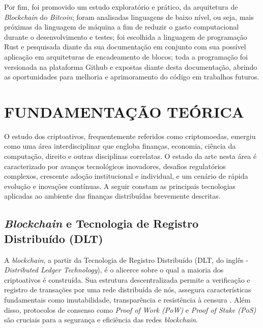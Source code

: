 \documentclass[article,12pt,oneside,a4paper,english,brazil]{unifil}
\begin{document}
\begin{Spacing}{1.5}
Por fim, foi promovido um estudo exploratório e prático, da arquitetura de \textit{Blockchain} do \textit{Bitcoin}; foram analisadas linguagens de baixo nível, ou seja, mais próximas da linguagem de máquina a fim de reduzir o gasto computacional durante o desenvolvimento e testes; foi escolhida a linguagem de programação Rust e pesquisada diante da sua documentação em conjunto com sua possível aplicação em arquiteturas de encadeamento de blocos; toda a programação foi versionada na plataforma Github e expostas diante desta documentação, abrindo as oportunidades para melhoria e aprimoramento do código em trabalhos futuros.  



% 

\section*{FUNDAMENTAÇÃO TEÓRICA}
O estudo dos criptoativos, frequentemente referidos como criptomoedas, emergiu como uma área interdisciplinar que engloba finanças, economia, ciência da computação, direito e outras disciplinas correlatas. O estado da arte nesta área é caracterizado por avanços tecnológicos inovadores, desafios regulatórios complexos, crescente adoção institucional e individual, e um cenário de rápida evolução e inovações contínuas. A seguir constam as principais tecnologias aplicadas ao ambiente das finanças distribuídas brevemente descritas.

\subsection*{\textit{Blockchain} e Tecnologia de Registro Distribuído (DLT)}

A \textit{blockchain}, a partir da Tecnologia de Registro Distribuído (DLT, do inglês - \textit{Distributed Ledger Technology}), é o alicerce sobre o qual a maioria dos criptoativos é construída. Sua estrutura descentralizada  permite a verificação e registro de transações por uma rede distribuída de nós, assegura características fundamentais como imutabilidade, transparência e resistência à censura \cite{Nakamoto2009}. Além disso, protocolos de consenso como \textit{Proof of Work (PoW)} e \textit{Proof of Stake (PoS)} são cruciais para a segurança e eficiência das redes \textit{blockchain}.


\end{Spacing}
\end{document}
